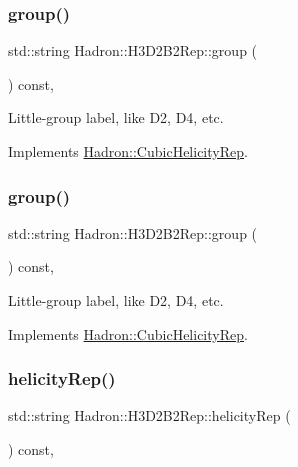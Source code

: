 \subsubsection{\texorpdfstring{group()}{group()}\hspace{0.1cm}{\footnotesize\ttfamily [2/3]}}
{\footnotesize\ttfamily std\+::string Hadron\+::\+H3\+D2\+B2\+Rep\+::group (\begin{DoxyParamCaption}{ }\end{DoxyParamCaption}) const\hspace{0.3cm}{\ttfamily [inline]}, {\ttfamily [virtual]}}

Little-\/group label, like D2, D4, etc. 

Implements \mbox{\hyperlink{structHadron_1_1CubicHelicityRep_a101a7d76cd8ccdad0f272db44b766113}{Hadron\+::\+Cubic\+Helicity\+Rep}}.

\mbox{\label{structHadron_1_1H3D2B2Rep_a54d96e4bedb375325552d1f5e8149f30}} 
\subsubsection{\texorpdfstring{group()}{group()}\hspace{0.1cm}{\footnotesize\ttfamily [3/3]}}
{\footnotesize\ttfamily std\+::string Hadron\+::\+H3\+D2\+B2\+Rep\+::group (\begin{DoxyParamCaption}{ }\end{DoxyParamCaption}) const\hspace{0.3cm}{\ttfamily [inline]}, {\ttfamily [virtual]}}

Little-\/group label, like D2, D4, etc. 

Implements \mbox{\hyperlink{structHadron_1_1CubicHelicityRep_a101a7d76cd8ccdad0f272db44b766113}{Hadron\+::\+Cubic\+Helicity\+Rep}}.

\mbox{\label{structHadron_1_1H3D2B2Rep_a3e941d14c5dea81e231504962222c3c5}} 
\subsubsection{\texorpdfstring{helicityRep()}{helicityRep()}\hspace{0.1cm}{\footnotesize\ttfamily [1/2]}}
{\footnotesize\ttfamily std\+::string Hadron\+::\+H3\+D2\+B2\+Rep\+::helicity\+Rep (\begin{DoxyParamCaption}{ }\end{DoxyParamCaption}) const\hspace{0.3cm}{\ttfamily [inline]}, {\ttfamily [virtual]}}

